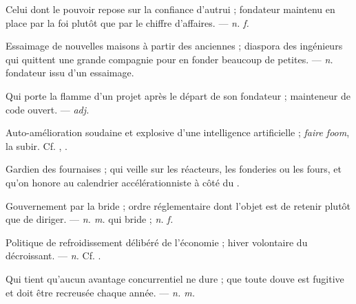  Celui dont le pouvoir repose sur la confiance d'autrui ; fondateur maintenu en place par la foi plutôt que par le chiffre d'affaires.  ---  \textit{n. f.}

 Essaimage de nouvelles maisons à partir des anciennes ; diaspora des ingénieurs qui quittent une grande compagnie pour en fonder beaucoup de petites.   ---  \textit{n.} fondateur issu d'un essaimage.

 Qui porte la flamme d'un projet après le départ de son fondateur ; mainteneur de code ouvert.  ---  \textit{adj.}

  Auto-amélioration soudaine et explosive d'une intelligence artificielle ; \textit{faire foom}, la subir. Cf. , .

 Gardien des fournaises ; qui veille sur les réacteurs, les fonderies ou les fours, et qu'on honore au calendrier accélérationniste à côté du .

 Gouvernement par la bride ; ordre réglementaire dont l'objet est de retenir plutôt que de diriger. ---  \textit{n. m.} qui bride ;  \textit{n. f.}

  Politique de refroidissement délibéré de l'économie ; hiver volontaire du décroissant.   ---  \textit{n.} Cf. .

 Qui tient qu'aucun avantage concurrentiel ne dure ; que toute douve est fugitive et doit être recreusée chaque année.  ---  \textit{n. m.}

